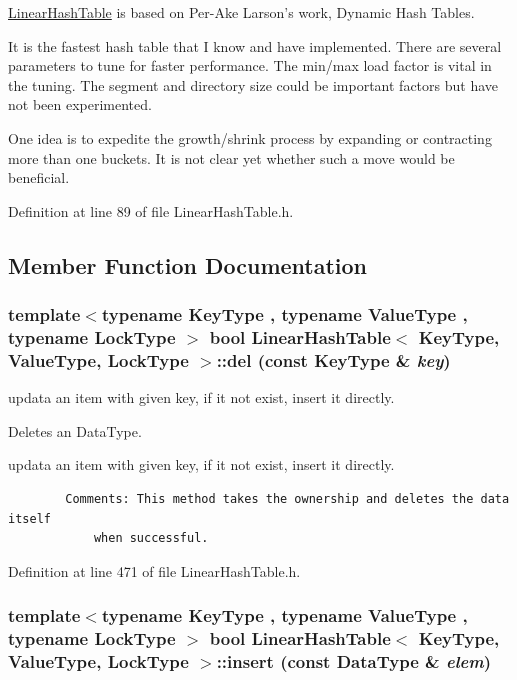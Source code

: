 \hyperlink{classLinearHashTable}{LinearHashTable} is based on Per-Ake Larson's work, Dynamic Hash Tables. 

It is the fastest hash table that I know and have implemented. There are several parameters to tune for faster performance. The min/max load factor is vital in the tuning. The segment and directory size could be important factors but have not been experimented.

One idea is to expedite the growth/shrink process by expanding or contracting more than one buckets. It is not clear yet whether such a move would be beneficial. 

Definition at line 89 of file LinearHashTable.h.

\subsection{Member Function Documentation}
\hypertarget{classLinearHashTable_4008d6c42a099654c137d212f83176ae}{
\subsubsection[{del}]{\setlength{\rightskip}{0pt plus 5cm}template$<$typename KeyType , typename ValueType , typename LockType $>$ bool {\bf LinearHashTable}$<$ KeyType, ValueType, LockType $>$::del (const KeyType \& {\em key})}}
\label{classLinearHashTable_4008d6c42a099654c137d212f83176ae}


updata an item with given key, if it not exist, insert it directly. 

Deletes an DataType.

updata an item with given key, if it not exist, insert it directly.



\begin{Code}\begin{verbatim}        Comments: This method takes the ownership and deletes the data itself
            when successful.
\end{verbatim}
\end{Code}

 

Definition at line 471 of file LinearHashTable.h.\hypertarget{classLinearHashTable_6cfa4db9583b1dd5615cedfb2220e7f3}{
\subsubsection[{insert}]{\setlength{\rightskip}{0pt plus 5cm}template$<$typename KeyType , typename ValueType , typename LockType $>$ bool {\bf LinearHashTable}$<$ KeyType, ValueType, LockType $>$::insert (const DataType \& {\em elem})}}
\label{classLinearHashTable_6cfa4db9583b1dd5615cedfb2220e7f3}


